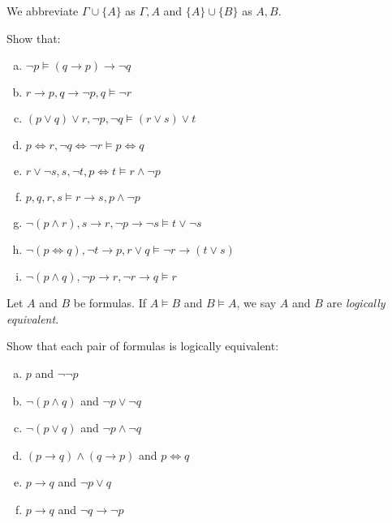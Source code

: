 \documentclass{article}
\begin{document}
\begin{notation} 
    We abbreviate $\Gamma \cup \{ A \}$ as $\Gamma, A$ and $\{ A \} \cup \{ B \}$ as $A, B$.
\end{notation}

\begin{prob}{2.2}
    Show that:
    \begin{multicols}{2}
    \begin{enumerate}[a)]
    \item $\neg p \models (q \to p) \to \neg q$
    \item ${r \to p}, {q \to \neg p}, q \models \neg r$
    \item $(p \vee q) \vee r, \neg p, \neg q \models (r \vee s) \vee t$
    \item ${p \iff r}, {\neg q \iff \neg r} \models {p \iff q}$
    \item ${r \vee \neg s}, s, \neg t, {p \iff t} \models {r \wedge \neg p}$
    \item $p, q, r, s \models {r \to s}, {p \wedge \neg p}$
    \item ${\neg (p \wedge r)}, {s \to r}, {\neg p \to \neg s} \models t \vee {\neg s}$
    \item ${\neg (p \iff q)}, {\neg t \to p}, {r \vee q} \models {\neg r \to (t \vee s)}$
    \item ${\neg (p \wedge q)}, {\neg p \to r}, {\neg r \to q} \models r$
    \end{enumerate}
    \end{multicols}
\end{prob}

\begin{definition}
    Let $A$ and $B$ be formulas. If $A \models B$ and $B \models A$, we say $A$ and $B$ are \emph{logically equivalent}.
\end{definition}

\begin{prob}{2.3}
    Show that each pair of formulas is logically equivalent:
    \begin{multicols}{2}
    \begin{enumerate}[a)]
    \item $p$ and $\neg \neg p$
    \item $\neg (p \wedge q)$ and $\neg p \vee \neg q$
    \item $\neg (p \vee q)$ and $\neg p \wedge \neg q$
    \item $(p \to q) \wedge (q \to p)$ and $p \iff q$
    \item $p \to q$ and $\neg p \vee q$
    \item $p \to q$ and $\neg q \to \neg p$
    \end{enumerate}
    \end{multicols}
\end{prob}
\end{document}
